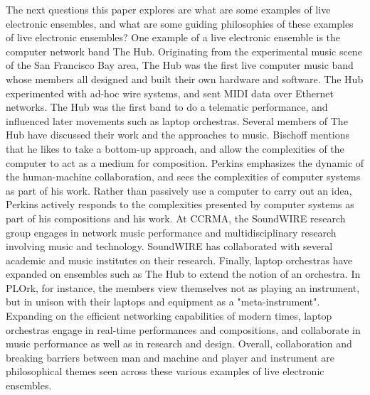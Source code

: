 \documentclass[letterpaper, 12pt]{article}
\begin{document}
%
The next questions this paper explores are what are some examples of live electronic ensembles, and what are some guiding philosophies of these examples of live electronic ensembles?
%
One example of a live electronic ensemble is the computer network band The Hub.
%
Originating from the experimental music scene of the San Francisco Bay area, The Hub was the first live computer music band whose members all designed and built their own hardware and software.
%
The Hub experimented with ad-hoc wire systems, and sent MIDI data over Ethernet networks.
%
The Hub was the first band to do a telematic performance, and influenced later movements such as laptop orchestras.
%
Several members of The Hub have discussed their work and the approaches to music.
%
Bischoff mentions that he likes to take a bottom-up approach, and allow the complexities of the computer to act as a medium for composition.
%
Perkins emphasizes the dynamic of the human-machine collaboration, and sees the complexities of computer systems as part of his work.
%
Rather than passively use a computer to carry out an idea, Perkins actively responds to the complexities presented by computer systems as part of his compositions and his work.
%
At CCRMA, the SoundWIRE research group engages in network music performance and multidisciplinary research involving music and technology.
%
SoundWIRE has collaborated with several academic and music institutes on their research.
%
Finally, laptop orchestras have expanded on ensembles such as The Hub to extend the notion of an orchestra.
%
In PLOrk, for instance, the members view themselves not as playing an instrument, but in unison with their laptops and equipment as a "meta-instrument".
%
Expanding on the efficient networking capabilities of modern times, laptop orchestras engage in real-time performances and compositions, and collaborate in music performance as well as in research and design.
%
Overall, collaboration and breaking barriers between man and machine and player and instrument are philosophical themes seen across these various examples of live electronic ensembles.
\end{document}
